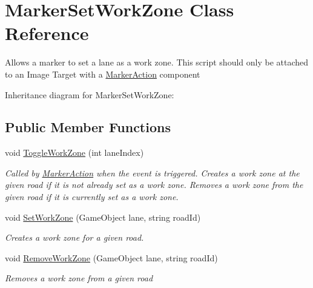 \hypertarget{class_marker_set_work_zone}{}\section{Marker\+Set\+Work\+Zone Class Reference}
\label{class_marker_set_work_zone}


Allows a marker to set a lane as a work zone. This script should only be attached to an Image Target with a \mbox{\hyperlink{class_marker_action}{Marker\+Action}} component  


Inheritance diagram for Marker\+Set\+Work\+Zone\+:\begin{figure}[H]
\begin{center}
\leavevmode
\end{center}
\end{figure}
\subsection*{Public Member Functions}
\begin{DoxyCompactItemize}
\item 
void \mbox{\hyperlink{class_marker_set_work_zone_a97b266550460ab718ded641db864704c}{Toggle\+Work\+Zone}} (int lane\+Index)
\begin{DoxyCompactList}\small\item\em Called by \mbox{\hyperlink{class_marker_action}{Marker\+Action}} when the event is triggered. Creates a work zone at the given road if it is not already set as a work zone. Removes a work zone from the given road if it is currently set as a work zone. \end{DoxyCompactList}\item 
void \mbox{\hyperlink{class_marker_set_work_zone_ab68a05bfd9dfa2a2de396731e88dba4d}{Set\+Work\+Zone}} (Game\+Object lane, string road\+Id)
\begin{DoxyCompactList}\small\item\em Creates a work zone for a given road. \end{DoxyCompactList}\item 
void \mbox{\hyperlink{class_marker_set_work_zone_a5837be3e42404f7b224c4b6db403700e}{Remove\+Work\+Zone}} (Game\+Object lane, string road\+Id)
\begin{DoxyCompactList}\small\item\em Removes a work zone from a given road \end{DoxyCompactList}\end{DoxyCompactItemize}
